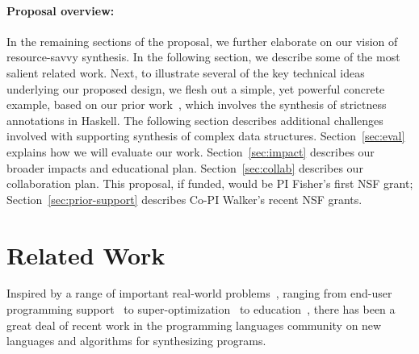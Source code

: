 \paragraph*{Proposal overview:}  In the remaining sections of the 
proposal, we further elaborate on our vision of
resource-savvy synthesis. 
In the following section, we describe some of the most salient related work.
Next, to illustrate several of
the key technical ideas underlying our proposed design, we flesh out a
simple, yet powerful concrete example, based on our
prior work~\cite{autobahn}, which involves the synthesis of strictness
annotations in Haskell.  The following section describes additional
challenges involved with supporting synthesis of complex
data structures.  Section~\ref{sec:eval} explains how we will evaluate
our work.  Section~\ref{sec:impact} describes our broader impacts
and educational plan.  Section~\ref{sec:collab} describes our collaboration plan.
This proposal, if funded, would be PI Fisher's first NSF grant;
Section~\ref{sec:prior-support} describes Co-PI Walker's recent NSF grants.

\section{Related Work}
\label{sec:related}


Inspired by a range of important real-world
problems~\cite{inductive-programming-meets-real-world}, ranging from
end-user programming
support~\cite{Barowy:flashrelate,Harris:spread-sheets} to
super-optimization~\cite{stochastic-superopt} to
education~\cite{Gulwani:cacm-education,Singh:education}, there has
been a great deal of recent work in the programming languages
community on new languages and algorithms for synthesizing programs.

